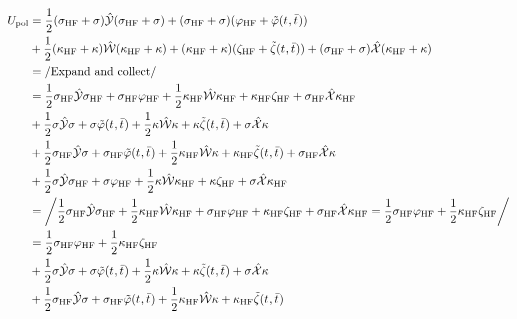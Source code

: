 \begin{equation}
  \begin{aligned}
  U_\mathrm{pol} &=
  \frac{1}{2}(\sigma_\mathrm{HF}+\sigma)\PCM(\sigma_\mathrm{HF}+\sigma)
+ (\sigma_\mathrm{HF}+\sigma)(\esp_\mathrm{HF}+\tilde{\esp}(\tamp{},\tbar{})) \\
&+ \frac{1}{2}(\kappa_\mathrm{HF}+\kappa)\MM(\kappa_\mathrm{HF}+\kappa)
+ (\kappa_\mathrm{HF}+\kappa)(\zeta_\mathrm{HF}+\tilde{\zeta}(\tamp{},\tbar{}))
+ (\sigma_\mathrm{HF}+\sigma)\bi{X}(\kappa_\mathrm{HF}+\kappa) \\
&= \left/ \text{Expand and collect} \right/ \\
&=
    \frac{1}{2}\sigma_\mathrm{HF}\PCM\sigma_\mathrm{HF}
  + \sigma_\mathrm{HF}\esp_\mathrm{HF}
  + \frac{1}{2}\kappa_\mathrm{HF}\MM\kappa_\mathrm{HF}
  + \kappa_\mathrm{HF}\zeta_\mathrm{HF}
  + \sigma_\mathrm{HF}\bi{X}\kappa_\mathrm{HF} \\
&+  \frac{1}{2}\sigma\PCM\sigma
  + \sigma\tilde{\esp}(\tamp{},\tbar{})
  + \frac{1}{2}\kappa\MM\kappa
  + \kappa\tilde{\zeta}(\tamp{},\tbar{})
  + \sigma\bi{X}\kappa \\
&+  \frac{1}{2}\sigma_\mathrm{HF}\PCM\sigma
  + \sigma_\mathrm{HF}\tilde{\esp}(\tamp{},\tbar{})
  + \frac{1}{2}\kappa_\mathrm{HF}\MM\kappa
  + \kappa_\mathrm{HF}\tilde{\zeta}(\tamp{},\tbar{})
  + \sigma_\mathrm{HF}\bi{X}\kappa \\
&+  \frac{1}{2}\sigma\PCM\sigma_\mathrm{HF}
  + \sigma\esp_\mathrm{HF}
  + \frac{1}{2}\kappa\MM\kappa_\mathrm{HF}
  + \kappa\zeta_\mathrm{HF}
  + \sigma\bi{X}\kappa_\mathrm{HF} \\
&= \left/
  \frac{1}{2}\sigma_\mathrm{HF}\PCM\sigma_\mathrm{HF}
  +
  \frac{1}{2}\kappa_\mathrm{HF}\MM\kappa_\mathrm{HF}
  +
  \sigma_\mathrm{HF}\esp_\mathrm{HF}
  +
  \kappa_\mathrm{HF}\zeta_\mathrm{HF}
  +
  \sigma_\mathrm{HF}\bi{X}\kappa_\mathrm{HF}
  =
  \frac{1}{2}\sigma_\mathrm{HF}\esp_\mathrm{HF}
  +
  \frac{1}{2}\kappa_\mathrm{HF}\zeta_\mathrm{HF}
  \right/ \\
&=
    \frac{1}{2}\sigma_\mathrm{HF}\esp_\mathrm{HF}
  + \frac{1}{2}\kappa_\mathrm{HF}\zeta_\mathrm{HF} \\
&+  \frac{1}{2}\sigma\PCM\sigma
  + \sigma\tilde{\esp}(\tamp{},\tbar{})
  + \frac{1}{2}\kappa\MM\kappa
  + \kappa\tilde{\zeta}(\tamp{},\tbar{})
  + \sigma\bi{X}\kappa \\
&+  \frac{1}{2}\sigma_\mathrm{HF}\PCM\sigma
  + \sigma_\mathrm{HF}\tilde{\esp}(\tamp{},\tbar{})
  + \frac{1}{2}\kappa_\mathrm{HF}\MM\kappa
  + \kappa_\mathrm{HF}\tilde{\zeta}(\tamp{},\tbar{})

\end{aligned}
\end{equation}
